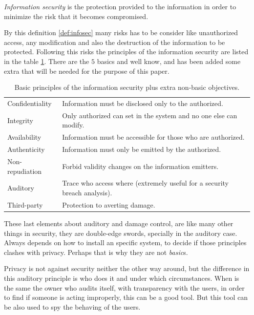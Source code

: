 \documentclass[10pt,a4paper,twoside]{llncs}
\begin{document}
\begin{definition}\label{def:infosec}
    \emph{Information security} is the protection provided to the information in order to minimize the risk that it becomes compromised.
\end{definition}

By this definition \ref{def:infosec} many risks has to be consider like unauthorized access, any modification and also the destruction of the information to be protected. Following this risks the principles of the information security are listed in the table \ref{tab:infosec}. There are the $5$ basics and well know, and has been added some extra that will be needed for the purpose of this paper.

\begin{table}[h]
    \begin{center}
        \begin{tabular}{|l|l|}
            \hline
            Confidentiality & Information must be disclosed only to the authorized. \\
            Integrity & Only authorized can set in the system and no one else can modify. \\
            Availability & Information must be accessible for those who are authorized. \\
            Authenticity & Information must only be emitted by the authorized. \\
            Non-repudiation & Forbid validity changes on the information emitters. \\
            \hline
            Auditory & Trace who access where (extremely useful for a security breach analysis). \\
            Third-party & Protection to averting damage. \\
            \hline
        \end{tabular}
        \caption{Basic principles of the information security plus extra non-basic objectives.}\label{tab:infosec}
    \end{center}
\end{table}

These last elements about auditory and damage control, are like many other things in security, they are double-edge swords, specially in the auditory case. Always depends on how to install an specific system, to decide if those principles clashes with privacy. Perhaps that is why they are not \emph{basic}s. 

Privacy is not against security neither the other way around, but the difference in this auditory principle is who does it and under which circumstances. When is the same the owner who audits itself, with transparency with the users, in order to find if someone is acting improperly, this can be a good tool. But this tool can be also used to spy the behaving of the users.
\end{document}
